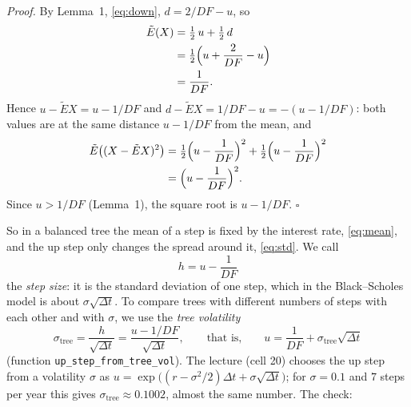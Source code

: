 \documentclass[11pt,a4paper]{article}
\newcommand{\Et}{\tilde{E}}
\begin{document}
\noindent\textit{Proof.} By Lemma~1, \eqref{eq:down}, $d=2/DF-u$, so
\begin{align*}
\Et(X) &= \tfrac12\,u+\tfrac12\,d\\
&= \tfrac12\Bigl(u+\frac2{DF}-u\Bigr)\\
&= \frac1{DF}.
\end{align*}
Hence $u-\Et X=u-1/DF$ and $d-\Et X=1/DF-u=-(u-1/DF)$: both values are at the same distance $u-1/DF$ from the mean, and
\begin{align*}
\Et\bigl((X-\Et X)^2\bigr) &= \tfrac12\Bigl(u-\frac1{DF}\Bigr)^2+\tfrac12\Bigl(u-\frac1{DF}\Bigr)^2\\
&= \Bigl(u-\frac1{DF}\Bigr)^2 .
\end{align*}
Since $u>1/DF$ (Lemma~1), the square root is $u-1/DF$. \hfill$\square$

\noindent So in a balanced tree the mean of a step is fixed by the interest rate, \eqref{eq:mean}, and the up step only changes the spread around it, \eqref{eq:std}. We call
\[
h=u-\frac1{DF}
\]
the \emph{step size}: it is the standard deviation of one step, which in the Black--Scholes model is about $\sigma\sqrt{\Delta t}$. To compare trees with different numbers of steps with each other and with $\sigma$, we use the \emph{tree volatility}
\[
\sigma_{\text{tree}}=\frac{h}{\sqrt{\Delta t}}=\frac{u-1/DF}{\sqrt{\Delta t}},
\qquad\text{that is,}\qquad u=\frac1{DF}+\sigma_{\text{tree}}\sqrt{\Delta t}
\]
(function \texttt{up\_step\_from\_tree\_vol}). The lecture (cell 20) chooses the up step from a volatility $\sigma$ as $u=\exp\bigl((r-\sigma^2/2)\Delta t+\sigma\sqrt{\Delta t}\bigr)$; for $\sigma=0.1$ and $7$ steps per year this gives $\sigma_{\text{tree}}\approx0.1002$, almost the same number. The check:
\end{document}
